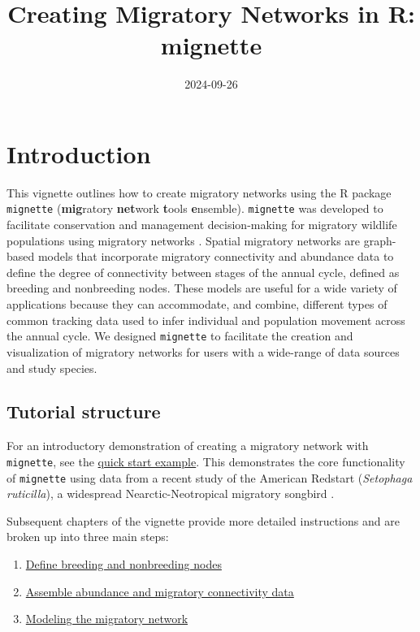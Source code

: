 \documentclass[
]{book}
\title{Creating Migratory Networks in R: mignette}
\author{}
\date{\vspace{-2.5em}2024-09-26}
\providecommand{\tightlist}{%
  \setlength{\itemsep}{0pt}\setlength{\parskip}{0pt}}
\begin{document}
\maketitle

{
\setcounter{tocdepth}{1}
\tableofcontents
}
\hypertarget{introduction}{%
\chapter{Introduction}\label{introduction}}

This vignette outlines how to create migratory networks using the R package \texttt{mignette} (\textbf{mig}ratory \textbf{net}work \textbf{t}ools \textbf{e}nsemble). \texttt{mignette} was developed to facilitate conservation and management decision-making for migratory wildlife populations using migratory networks \citep{ruegg2020genoscape, taylor2010population}. Spatial migratory networks are graph-based models that incorporate migratory connectivity and abundance data to define the degree of connectivity between stages of the annual cycle, defined as breeding and nonbreeding nodes. These models are useful for a wide variety of applications because they can accommodate, and combine, different types of common tracking data used to infer individual and population movement across the annual cycle. We designed \texttt{mignette} to facilitate the creation and visualization of migratory networks for users with a wide-range of data sources and study species.

\hypertarget{tutorial-structure}{%
\section{Tutorial structure}\label{tutorial-structure}}

For an introductory demonstration of creating a migratory network with \texttt{mignette}, see the \protect\hyperlink{quickstart}{quick start example}. This demonstrates the core functionality of \texttt{mignette} using data from a recent study of the American Redstart (\emph{Setophaga ruticilla}), a widespread Nearctic-Neotropical migratory songbird \citep{desaix2023low}.

Subsequent chapters of the vignette provide more detailed instructions and are broken up into three main steps:

\begin{enumerate}
\def\labelenumi{\arabic{enumi}.}
\tightlist
\item
  \protect\hyperlink{nodes}{Define breeding and nonbreeding nodes}
\item
  \protect\hyperlink{data}{Assemble abundance and migratory connectivity data}
\item
  \protect\hyperlink{model}{Modeling the migratory network}
\end{enumerate}
\end{document}
